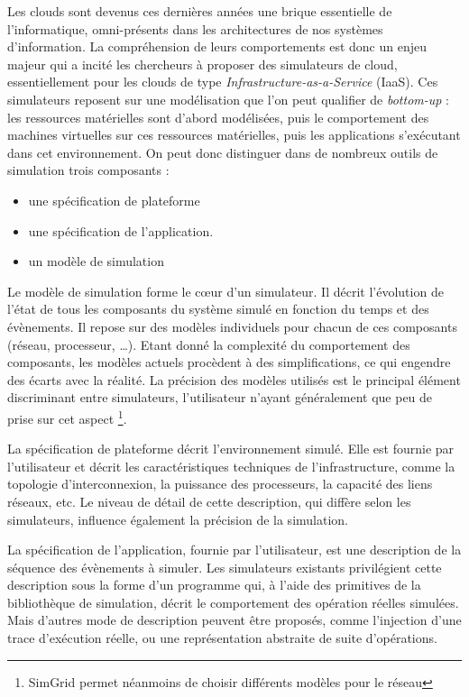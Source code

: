 \documentclass[parallelisme]{compas2017}
\begin{document}
Les  clouds  sont  devenus  ces  dernières  années  une  brique  essentielle  de
l'informatique,   omni-présents  dans   les   architectures   de  nos   systèmes
d'information. La compréhension de leurs  comportements est donc un enjeu majeur
qui a incité les chercheurs à proposer des simulateurs de cloud, essentiellement
pour les clouds de type \textit{Infrastructure-as-a-Service} (IaaS). Ces
simulateurs   reposent   sur   une   modélisation  que l'on peut qualifier de
\textit{bottom-up} : les ressources matérielles sont d'abord modélisées, puis le
comportement des  machines virtuelles sur  ces ressources matérielles,  puis les
applications s'exécutant dans cet environnement. On peut donc distinguer dans 
de nombreux outils de simulation trois composants : 
\begin{itemize}
		\item une spécification de plateforme
		\item une spécification de l'application.
		\item un modèle de simulation
\end{itemize}

Le modèle de simulation forme le cœur d'un simulateur. Il décrit l'évolution de
l'état de tous  les composants du système  simulé en fonction du  temps et des
évènements.   Il  repose  sur  des   modèles  individuels  pour  chacun  de  ces
composants  (réseau,  processeur,  \ldots).   Etant  donné  la  complexité  du
comportement   des   composants,  les   modèles   actuels   procèdent  à   des
simplifications, ce qui engendre des écarts avec la réalité. La précision des 
modèles utilisés est le principal élément discriminant
entre simulateurs, l'utilisateur  n'ayant généralement que peu de  prise sur cet
aspect%
\footnote{SimGrid  permet  néanmoins  de  choisir  différents  modèles  pour  le
  réseau}.

La spécification de plateforme décrit  l'environnement simulé.  Elle est fournie
par l'utilisateur et décrit les caractéristiques techniques de l'infrastructure,
comme la topologie  d'interconnexion, la puissance des  processeurs, la capacité
des liens réseaux,  etc.  Le niveau de détail de  cette description, qui diffère
selon les simulateurs, influence également la précision de la simulation.

La  spécification   de  l'application,   fournie  par  l'utilisateur,   est  une
description de la  séquence des évènements à simuler.  Les simulateurs existants
privilégient cette  description sous la forme  d'un programme qui, à  l'aide des
primitives  de  la  bibliothèque  de  simulation,  décrit  le  comportement  des
opération  réelles simulées.   Mais d'autres  mode de  description peuvent  être
proposés,   comme   l'injection  d'une   trace   d'exécution   réelle,  ou   une
représentation abstraite de suite d'opérations. 
\end{document}
